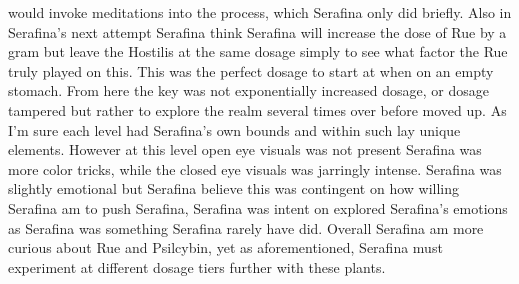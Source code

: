 \documentclass[12pt]{book}
\begin{document}
would invoke meditations into the process, which Serafina only did briefly. Also in Serafina's next attempt Serafina think Serafina will increase the dose of Rue by a gram but leave the Hostilis at the same dosage simply to see what factor the Rue truly played on this. This was the perfect dosage to start at when on an empty stomach. From here the key was not exponentially increased dosage, or dosage tampered but rather to explore the realm several times over before moved up. As I'm sure each level had Serafina's own bounds and within such lay unique elements. However at this level open eye visuals was not present Serafina was more color tricks, while the closed eye visuals was jarringly intense. Serafina was slightly emotional but Serafina believe this was contingent on how willing Serafina am to push Serafina, Serafina was intent on explored Serafina's emotions as Serafina was something Serafina rarely have did. Overall Serafina am more curious about Rue and Psilcybin, yet as aforementioned, Serafina must experiment at different dosage tiers further with these plants.
\end{document}
